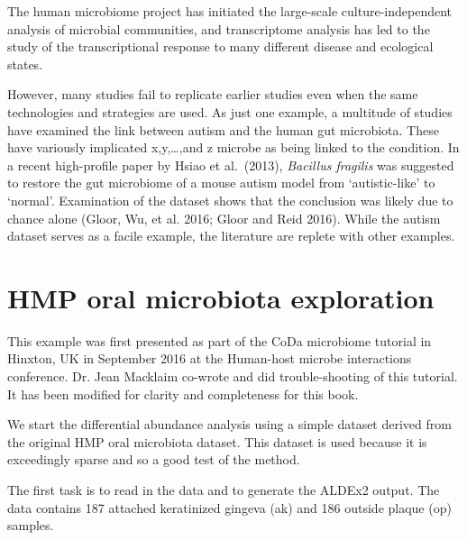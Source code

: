 \documentclass[onecolumn]{article}
\begin{document}
The human microbiome project has initiated the large-scale culture-independent analysis of microbial communities, and transcriptome analysis has led to the study of the transcriptional response to many different disease and ecological states.

However, many studies fail to replicate earlier studies even when the same technologies and strategies are used. As just one example, a multitude of studies have examined the link between autism and the human gut microbiota. These have variously implicated x,y,\ldots{},and z microbe as being linked to the condition. In a recent high-profile paper by Hsiao et al.~(2013), \emph{Bacillus fragilis} was suggested to restore the gut microbiome of a mouse autism model from `autistic-like' to `normal'. Examination of the dataset shows that the conclusion was likely due to chance alone (Gloor, Wu, et al. 2016; Gloor and Reid 2016). While the autism dataset serves as a facile example, the literature are replete with other examples.

\hypertarget{oral}{%
\section{HMP oral microbiota exploration}\label{oral}}

\hspace{2cm}\begin{minipage}[ct]{10cm}
\parskip=5pt
\parindent=5pt
This example was first presented as part of the CoDa microbiome tutorial in Hinxton, UK in September 2016 at the Human-host microbe interactions conference. Dr. Jean Macklaim co-wrote and did trouble-shooting of this tutorial. It has been modified for clarity and completeness for this book.
\end{minipage}
\vspace{1cm}

We start the differential abundance analysis using a simple dataset derived from the original HMP oral microbiota dataset. This dataset is used because it is exceedingly sparse and so a good test of the method.

The first task is to read in the data and to generate the ALDEx2 output. The data contains 187 attached keratinized gingeva (ak) and 186 outside plaque (op) samples.
\end{document}
